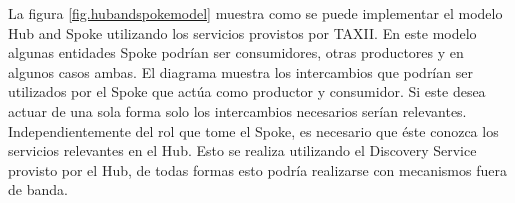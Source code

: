 La figura \ref{fig.hubandspokemodel} muestra como se puede implementar el modelo Hub and Spoke 
utilizando los servicios provistos por TAXII. En este modelo algunas entidades 
Spoke podrían ser consumidores, otras productores y en algunos casos ambas. El 
diagrama muestra los intercambios que podrían ser utilizados por el Spoke que 
actúa como productor y consumidor. Si este desea actuar de una sola forma solo 
los intercambios necesarios serían relevantes. Independientemente del rol que 
tome el Spoke, es necesario que éste conozca los servicios relevantes en el Hub. 
Esto se realiza utilizando el Discovery Service provisto por el Hub, de todas 
formas esto podría realizarse con mecanismos fuera de banda.



